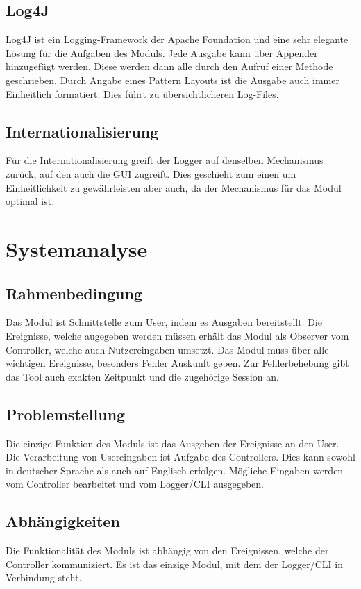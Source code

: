 \subsection{Log4J}
Log4J ist ein Logging-Framework der Apache Foundation und eine sehr elegante
Lösung für die Aufgaben des Moduls. Jede Ausgabe kann über Appender hinzugefügt
werden. Diese werden dann alle durch den Aufruf einer Methode geschrieben.
Durch Angabe eines Pattern Layouts ist die Ausgabe auch immer Einheitlich
formatiert. Dies führt zu übersichtlicheren Log-Files.

\subsection{Internationalisierung}
Für die Internationalisierung greift der Logger auf denselben Mechanismus
zurück, auf den auch die GUI zugreift. Dies geschieht zum einen um
Einheitlichkeit zu gewährleisten aber auch, da der Mechanismus für das Modul
optimal ist.

\section{Systemanalyse}

\subsection{Rahmenbedingung}
Das Modul ist Schnittstelle zum User, indem es Ausgaben bereitstellt. Die
Ereignisse, welche augegeben werden müssen erhält das Modul als Observer vom
Controller, welche auch Nutzereingaben umsetzt. Das Modul muss über alle
wichtigen Ereignisse, besonders Fehler Auskunft geben. Zur Fehlerbehebung gibt
das Tool auch exakten Zeitpunkt und die zugehörige Session an.

\subsection{Problemstellung}
Die einzige Funktion des Moduls ist das Ausgeben der Ereignisse an den User. Die
Verarbeitung von Usereingaben ist Aufgabe des Controllers. Dies kann sowohl in
deutscher Sprache als auch auf Englisch erfolgen. Mögliche Eingaben werden vom
Controller bearbeitet und vom Logger/CLI ausgegeben.

\subsection{Abhängigkeiten}
Die Funktionalität des Moduls ist abhängig von den Ereignissen, welche der
Controller kommuniziert. Es ist das einzige Modul, mit dem der Logger/CLI in
Verbindung steht.

